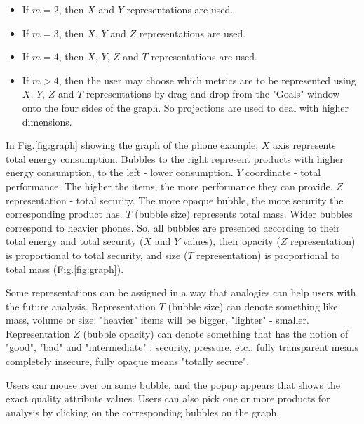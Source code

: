 \documentclass{acm_proc_article-sp}
\begin{document}
\begin{itemize}
\item If $m = 2$, then $X$ and $Y$ representations are used.
\item If $m = 3$, then $X$, $Y$ and $Z$ representations are used.
\item If $m = 4$, then $X$, $Y$, $Z$ and $T$ representations are used. 
\item If $m > 4$, then the user may choose which metrics are to be represented using $X$, $Y$, $Z$ and $T$ representations by drag-and-drop from the "Goals" window onto the four sides of the graph. So projections are used to deal with higher dimensions. 
\end{itemize}

In Fig.\ref{fig:graph} showing the graph of the phone example, $X$ axis represents total energy consumption. Bubbles to the right represent products with higher energy consumption, to the left - lower consumption. $Y$ coordinate - total performance. The higher the items, the more performance they can provide. $Z$ representation - total security. The more opaque bubble, the more security the corresponding product has. $T$ (bubble size) represents total mass. Wider bubbles correspond to heavier phones. So, all bubbles are presented according to their total energy and total security ($X$ and $Y$ values), their opacity ($Z$ representation) is proportional to total security, and size ($T$ representation) is proportional to total mass (Fig.\ref{fig:graph}).

Some representations can be assigned in a way that analogies can help users with the future analysis. Representation $T$ (bubble size) can denote something like mass, volume or size: "heavier" items will be bigger, "lighter" - smaller. Representation $Z$ (bubble opacity) can denote something that has the notion of "good", "bad" and "intermediate" : security, pressure, etc.: fully transparent means completely insecure, fully opaque means "totally secure".

Users can mouse over on some bubble, and the popup appears that shows the exact quality attribute values. Users can also pick one or more products for analysis by clicking on the corresponding bubbles on the graph.
\end{document}
